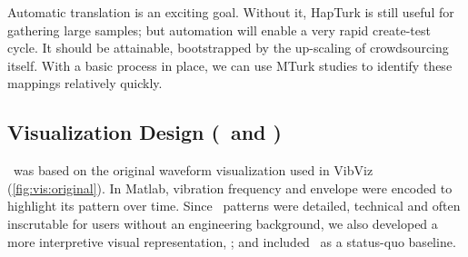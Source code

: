 Automatic translation is an exciting goal. Without it, HapTurk is still useful for gathering large samples; but automation will enable a very rapid create-test cycle. 
It should be attainable, bootstrapped by the up-scaling of crowdsourcing itself. With a  basic process in place, we can use MTurk studies to identify these mappings relatively quickly.

\subsection{Visualization Design (\original\ and \linear)}

    \original\ was based on the original waveform visualization used in VibViz  (\autoref{fig:vis:original}).
    In Matlab, vibration frequency and envelope were encoded to highlight its pattern over time.
    Since \original\ patterns were detailed, technical and often inscrutable for users without an engineering background, we also developed a more interpretive visual representation,  \linear; and 
    included \original\ as a status-quo baseline.

    
    
    
  
